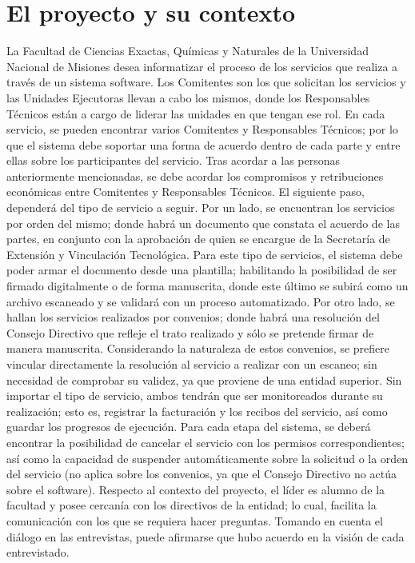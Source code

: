 \section[Contexto]{El proyecto y su contexto}
\normalsize{ \indent
La Facultad de Ciencias Exactas, Qu\'imicas y Naturales de la
Universidad Nacional de Misiones desea informatizar el proceso
de los servicios que realiza a trav\'es de un sistema software.
Los Comitentes son los que solicitan los servicios y las Unidades
Ejecutoras llevan a cabo los mismos, donde los Responsables
T\'ecnicos est\'an a cargo de liderar las unidades en que
tengan ese rol.
}
\newline
\normalsize{ \indent
En cada servicio, se pueden encontrar varios Comitentes y
Responsables T\'ecnicos; por lo que el sistema debe soportar
una forma de acuerdo dentro de cada parte y entre ellas sobre
los participantes del servicio. Tras acordar a las personas
anteriormente mencionadas, se debe acordar los compromisos
y retribuciones econ\'omicas entre Comitentes y Responsables
T\'ecnicos.
}
\newline
\normalsize{ \indent
El siguiente paso, depender\'a del tipo de servicio a seguir.
Por un lado, se encuentran los servicios por orden del mismo;
donde habr\'a un documento que constata el acuerdo de las
partes, en conjunto con la aprobaci\'on de quien se encargue
de la Secretar\'ia de Extensi\'on y Vinculaci\'on Tecnol\'ogica.
Para este tipo de servicios, el sistema debe poder armar el
documento desde una plantilla; habilitando la posibilidad
de ser firmado digitalmente o de forma manuscrita, donde
este \'ultimo se subir\'a como un archivo escaneado y
se validar\'a con un proceso automatizado.
}
\newline
\normalsize{ \indent
Por otro lado, se hallan los servicios realizados por convenios;
donde habr\'a una resoluci\'on del Consejo Directivo que
refleje el trato realizado y s\'olo se pretende firmar
de manera manuscrita. Considerando la naturaleza de
estos convenios, se prefiere vincular directamente la
resoluci\'on al servicio a realizar con un escaneo;
sin necesidad de comprobar su validez, ya que proviene
de una entidad superior.
}
\newline
\normalsize{ \indent
Sin importar el tipo de servicio, ambos tendr\'an que ser
monitoreados durante su realizaci\'on; esto es, registrar
la facturaci\'on y los recibos del servicio, as\'i como
guardar los progresos de ejecuci\'on.
}
\newline
\normalsize{ \indent
Para cada etapa del sistema, se deber\'a encontrar la
posibilidad de cancelar el servicio con los permisos
correspondientes; as\'i como la capacidad de suspender
autom\'aticamente sobre la solicitud o la orden del
servicio (no aplica sobre los convenios, ya que el
Consejo Directivo no act\'ua sobre el software).
}
\newline
\normalsize{ \indent
Respecto al contexto del proyecto, el l\'ider es alumno
de la facultad y posee cercan\'ia con los directivos
de la entidad; lo cual, facilita la comunicaci\'on con
los que se requiera hacer preguntas. Tomando en cuenta el
di\'alogo en las entrevistas, puede afirmarse que hubo
acuerdo en la visi\'on de cada entrevistado.
}
